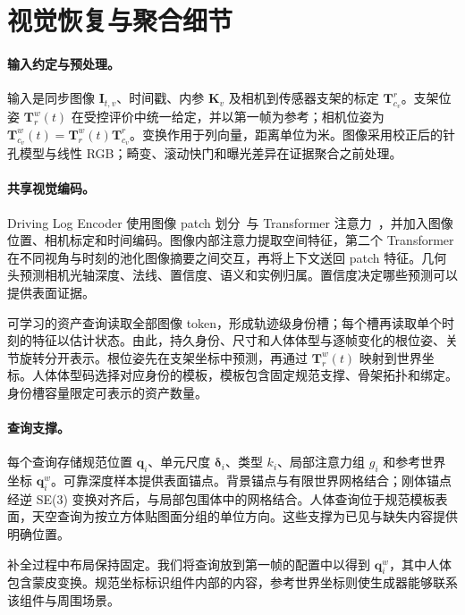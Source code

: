 \section{视觉恢复与聚合细节}
\label{sec:supp-queries}

\paragraph{输入约定与预处理。}

输入是同步图像 $\mathbf I_{t,v}$、时间戳、内参 $\mathbf K_v$ 及相机到传感器支架的标定 $\mathbf T^r_{c_v}$。支架位姿 $\mathbf T^w_r(t)$ 在受控评价中统一给定，并以第一帧为参考；相机位姿为 $\mathbf T^w_{c_v}(t)=\mathbf T^w_r(t)\mathbf T^r_{c_v}$。变换作用于列向量，距离单位为米。图像采用校正后的针孔模型与线性 RGB；畸变、滚动快门和曝光差异在证据聚合之前处理。

\paragraph{共享视觉编码。}

Driving Log Encoder 使用图像 patch 划分~\cite{dosovitskiy2021vit}与 Transformer 注意力~\cite{vaswani2017attention}，并加入图像位置、相机标定和时间编码。图像内部注意力提取空间特征，第二个 Transformer 在不同视角与时刻的池化图像摘要之间交互，再将上下文送回 patch 特征。几何头预测相机光轴深度、法线、置信度、语义和实例归属。置信度决定哪些预测可以提供表面证据。

可学习的资产查询读取全部图像 token，形成轨迹级身份槽；每个槽再读取单个时刻的特征以估计状态。由此，持久身份、尺寸和人体体型与逐帧变化的根位姿、关节旋转分开表示。根位姿先在支架坐标中预测，再通过 $\mathbf T^w_r(t)$ 映射到世界坐标。人体体型码选择对应身份的模板，模板包含固定规范支撑、骨架拓扑和绑定。身份槽容量限定可表示的资产数量。

\paragraph{查询支撑。}

每个查询存储规范位置 $\mathbf q_i$、单元尺度 $\boldsymbol\delta_i$、类型 $k_i$、局部注意力组 $g_i$ 和参考世界坐标 $\mathbf q_i^w$。可靠深度样本提供表面锚点。背景锚点与有限世界网格结合；刚体锚点经逆 SE(3) 变换对齐后，与局部包围体中的网格结合。人体查询位于规范模板表面，天空查询为按立方体贴图面分组的单位方向。这些支撑为已见与缺失内容提供明确位置。

补全过程中布局保持固定。我们将查询放到第一帧的配置中以得到 $\mathbf q_i^w$，其中人体包含蒙皮变换。规范坐标标识组件内部的内容，参考世界坐标则使生成器能够联系该组件与周围场景。

